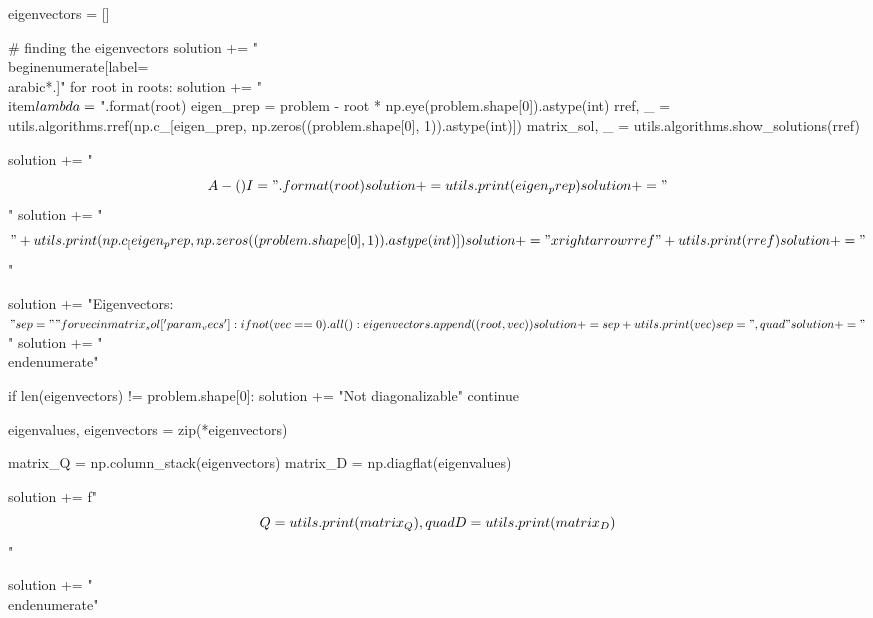 \documentclass[letterpaper]{article}
\newenvironment{question}[2][Question]{\begin{trivlist}
\item[\hskip \labelsep {\bfseries #1}\hskip \labelsep {\bfseries #2.}]}{\end{trivlist}}
\begin{document}
\begin{question}{5.29 (a)(c)(e)(g)}
\begin{pycode}
  eigenvectors = []

  # finding the eigenvectors 
  solution += "\\begin{enumerate}[label=\\arabic*.]\n"
  for root in roots:
    solution += "\\item$\\lambda = {}$\n".format(root)
    eigen_prep = problem - root * np.eye(problem.shape[0]).astype(int)
    rref, _ = utils.algorithms.rref(np.c_[eigen_prep, np.zeros((problem.shape[0], 1)).astype(int)])
    matrix_sol, _ = utils.algorithms.show_solutions(rref)

    solution += "$$A - ({}) I = ".format(root)
    solution += utils.print(eigen_prep)
    solution += "$$\n"
    solution += "$$" + utils.print(np.c_[eigen_prep, np.zeros((problem.shape[0], 1)).astype(int)])
    solution += "\\xrightarrow{rref}" + utils.print(rref)
    solution += "$$\n"

    solution += "Eigenvectors: $"

    sep = ""
    for vec in matrix_sol['param_vecs']:
      if not (vec == 0).all():
        eigenvectors.append((root, vec))
        solution += sep + utils.print(vec)
        sep = ",\\quad"

    solution += "$\n"
  solution += "\\end{enumerate}\n"

  if len(eigenvectors) != problem.shape[0]:
    solution += "Not diagonalizable\n"
    continue

  eigenvalues, eigenvectors = zip(*eigenvectors)

  matrix_Q = np.column_stack(eigenvectors)
  matrix_D = np.diagflat(eigenvalues)

  solution += f"$$Q = {utils.print(matrix_Q)}, \\quad D = {utils.print(matrix_D)}$$\n"

solution += "\\end{enumerate}"
  \end{pycode}

  
\end{question}
\end{document}
